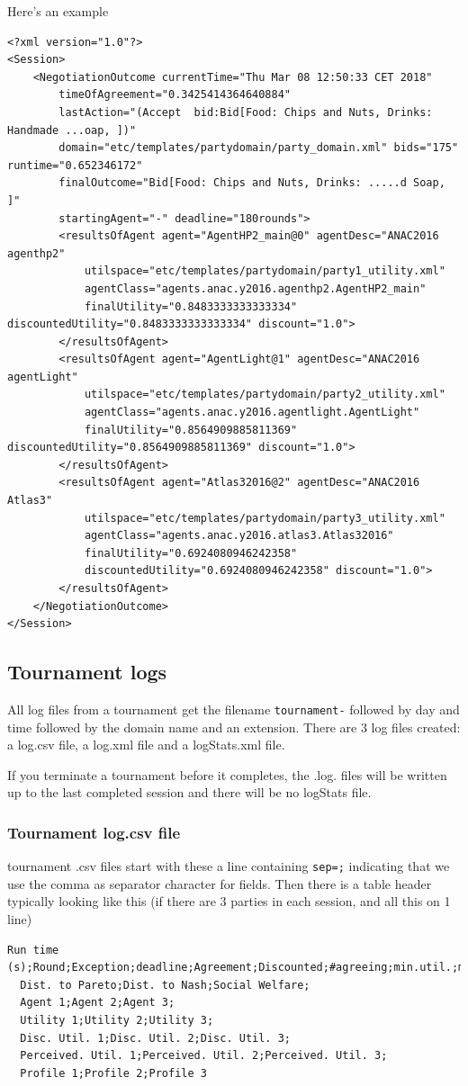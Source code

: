 \documentclass[]{article}
\begin{document}
Here's an example
\begin{verbatim}
<?xml version="1.0"?>
<Session>
	<NegotiationOutcome currentTime="Thu Mar 08 12:50:33 CET 2018" 
	    timeOfAgreement="0.3425414364640884" 
	    lastAction="(Accept  bid:Bid[Food: Chips and Nuts, Drinks: Handmade ...oap, ])" 
	    domain="etc/templates/partydomain/party_domain.xml" bids="175" runtime="0.652346172" 
	    finalOutcome="Bid[Food: Chips and Nuts, Drinks: .....d Soap, ]" 
	    startingAgent="-" deadline="180rounds">
		<resultsOfAgent agent="AgentHP2_main@0" agentDesc="ANAC2016 agenthp2" 
		    utilspace="etc/templates/partydomain/party1_utility.xml" 
		    agentClass="agents.anac.y2016.agenthp2.AgentHP2_main" 
		    finalUtility="0.8483333333333334" discountedUtility="0.8483333333333334" discount="1.0">
		</resultsOfAgent>
		<resultsOfAgent agent="AgentLight@1" agentDesc="ANAC2016 agentLight" 
		    utilspace="etc/templates/partydomain/party2_utility.xml" 
		    agentClass="agents.anac.y2016.agentlight.AgentLight" 
		    finalUtility="0.8564909885811369" discountedUtility="0.8564909885811369" discount="1.0">
		</resultsOfAgent>
		<resultsOfAgent agent="Atlas32016@2" agentDesc="ANAC2016 Atlas3" 
		    utilspace="etc/templates/partydomain/party3_utility.xml" 
		    agentClass="agents.anac.y2016.atlas3.Atlas32016" 
		    finalUtility="0.6924080946242358" 
		    discountedUtility="0.6924080946242358" discount="1.0">
		</resultsOfAgent>
	</NegotiationOutcome>
</Session>\end{verbatim}



\subsection{Tournament logs}
All log files from a tournament get the filename \verb|tournament-| followed by day and time followed by the domain name and an extension.
There are 3 log files created: a log.csv file, a log.xml file and a logStats.xml file.

If you terminate a tournament before it completes, the .log. files will be written up to the last completed session and there will be no logStats file.

\subsubsection{Tournament log.csv file}

tournament .csv files start with these a line containing \verb|sep=;| indicating that we use the comma as separator character for fields.
Then there is a table header typically looking like this (if there are 3 parties in each session, and all this on 1 line)
\begin{verbatim}
Run time (s);Round;Exception;deadline;Agreement;Discounted;#agreeing;min.util.;max.util.;
  Dist. to Pareto;Dist. to Nash;Social Welfare;
  Agent 1;Agent 2;Agent 3;
  Utility 1;Utility 2;Utility 3;
  Disc. Util. 1;Disc. Util. 2;Disc. Util. 3;
  Perceived. Util. 1;Perceived. Util. 2;Perceived. Util. 3;
  Profile 1;Profile 2;Profile 3
\end{verbatim}
\end{document}
